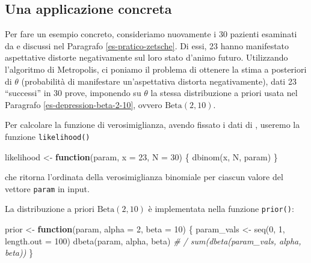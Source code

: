 \documentclass[
]{memoir}
\newenvironment{Shaded}{\begin{snugshade}}{\end{snugshade}}
\newcommand{\AttributeTok}[1]{\textcolor[rgb]{0.77,0.63,0.00}{#1}}
\newcommand{\CommentTok}[1]{\textcolor[rgb]{0.56,0.35,0.01}{\textit{#1}}}
\newcommand{\ControlFlowTok}[1]{\textcolor[rgb]{0.13,0.29,0.53}{\textbf{#1}}}
\newcommand{\DecValTok}[1]{\textcolor[rgb]{0.00,0.00,0.81}{#1}}
\newcommand{\FunctionTok}[1]{\textcolor[rgb]{0.00,0.00,0.00}{#1}}
\newcommand{\NormalTok}[1]{#1}
\newcommand{\OtherTok}[1]{\textcolor[rgb]{0.56,0.35,0.01}{#1}}
\begin{document}
\hypertarget{una-applicazione-concreta}{%
\subsection{Una applicazione concreta}\label{una-applicazione-concreta}}

Per fare un esempio concreto, consideriamo nuovamente i 30 pazienti esaminati da \citet{zetschefuture2019} e discussi nel Paragrafo \ref{es-pratico-zetsche}. Di essi, 23 hanno manifestato aspettative distorte negativamente sul loro stato d'animo futuro. Utilizzando l'algoritmo di Metropolis, ci poniamo il problema di ottenere la stima a posteriori di \(\theta\) (probabilità di manifestare un'aspettativa distorta negativamente), dati 23 ``successi'' in 30 prove, imponendo su \(\theta\) la stessa distribuzione a priori usata nel Paragrafo \ref{es-depression-beta-2-10}, ovvero \(\mbox{Beta}(2, 10)\).

Per calcolare la funzione di verosimiglianza, avendo fissato i dati di \citet{zetschefuture2019}, useremo la funzione \texttt{likelihood()}

\begin{Shaded}
\begin{Highlighting}[]
\NormalTok{likelihood }\OtherTok{\textless{}{-}} \ControlFlowTok{function}\NormalTok{(param, }\AttributeTok{x =} \DecValTok{23}\NormalTok{, }\AttributeTok{N =} \DecValTok{30}\NormalTok{) \{}
  \FunctionTok{dbinom}\NormalTok{(x, N, param)}
\NormalTok{\}}
\end{Highlighting}
\end{Shaded}

\noindent
che ritorna l'ordinata della verosimiglianza binomiale per ciascun valore del vettore \texttt{param} in input.

La distribuzione a priori \(\mbox{Beta}(2, 10)\) è implementata nella funzione \texttt{prior()}:

\begin{Shaded}
\begin{Highlighting}[]
\NormalTok{prior }\OtherTok{\textless{}{-}} \ControlFlowTok{function}\NormalTok{(param, }\AttributeTok{alpha =} \DecValTok{2}\NormalTok{, }\AttributeTok{beta =} \DecValTok{10}\NormalTok{) \{}
\NormalTok{  param\_vals }\OtherTok{\textless{}{-}} \FunctionTok{seq}\NormalTok{(}\DecValTok{0}\NormalTok{, }\DecValTok{1}\NormalTok{, }\AttributeTok{length.out =} \DecValTok{100}\NormalTok{)}
  \FunctionTok{dbeta}\NormalTok{(param, alpha, beta) }\CommentTok{\# / sum(dbeta(param\_vals, alpha, beta))}
\NormalTok{\}}
\end{Highlighting}
\end{Shaded}
\end{document}
